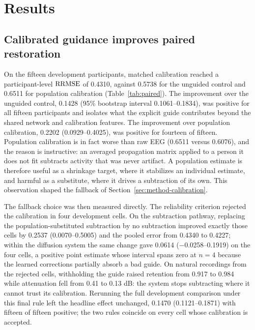 \section{Results}
\label{sec:results}

\subsection{Calibrated guidance improves paired restoration}
\label{sec:res-paired}

On the fifteen development participants, matched calibration reached a participant-level $\mathrm{RRMSE}$ of 0.4310, against 0.5738 for the unguided control and 0.6511 for population calibration (Table~\ref{tab:paired}). The improvement over the unguided control, 0.1428 (95\% bootstrap interval 0.1061--0.1834), was positive for all fifteen participants and isolates what the explicit guide contributes beyond the shared network and calibration features. The improvement over population calibration, 0.2202 (0.0929--0.4025), was positive for fourteen of fifteen. Population calibration is in fact worse than raw EEG (0.6511 versus 0.6076), and the reason is instructive: an averaged propagation matrix applied to a person it does not fit subtracts activity that was never artifact. A population estimate is therefore useful as a shrinkage target, where it stabilizes an individual estimate, and harmful as a substitute, where it drives a subtraction of its own. This observation shaped the fallback of Section~\ref{sec:method-calibration}.

The fallback choice was then measured directly. The reliability criterion rejected the calibration in four development cells. On the subtraction pathway, replacing the population-substituted subtraction by no subtraction improved exactly those cells by 0.2537 (0.0070--0.5005) and the pooled error from 0.4340 to 0.4227; within the diffusion system the same change gave 0.0614 ($-$0.0258--0.1919) on the four cells, a positive point estimate whose interval spans zero at $n=4$ because the learned corrections partially absorb a bad guide. On natural recordings from the rejected cells, withholding the guide raised retention from 0.917 to 0.984 while attenuation fell from 0.41 to 0.13 dB: the system stops subtracting where it cannot trust its calibration. Rerunning the full development comparison under this final rule left the headline effect unchanged, 0.1470 (0.1121--0.1871) with fifteen of fifteen positive; the two rules coincide on every cell whose calibration is accepted.

